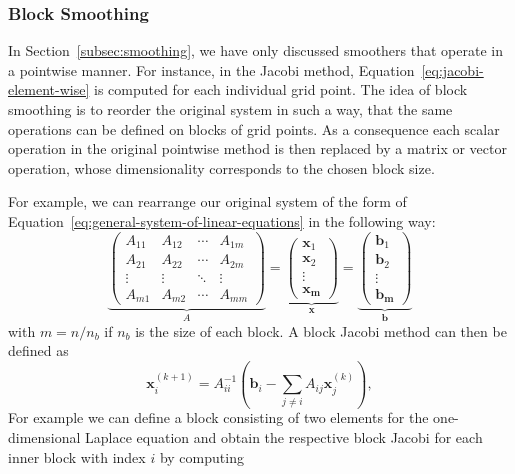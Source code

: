 \subsubsection{Block Smoothing}
\label{subsec:block-smoothing}
In Section~\ref{subsec:smoothing}, we have only discussed smoothers that operate in a pointwise manner.
For instance, in the Jacobi method, Equation~\eqref{eq:jacobi-element-wise} is computed for each individual grid point.
The idea of block smoothing is to reorder the original system in such a way, that the same operations can be defined on blocks of grid points.
As a consequence each scalar operation in the original pointwise method is then replaced by a matrix or vector operation, whose dimensionality corresponds to the chosen block size.

For example, we can rearrange our original system of the form of Equation~\eqref{eq:general-system-of-linear-equations} in the following way:
\begin{equation}
\underbrace{
\begin{pmatrix}A_{11}&A_{12}&\cdots &A_{1m}\\A_{21}&A_{22}&\cdots &A_{2m}\\\vdots &\vdots &\ddots &\vdots \\A_{m1}&A_{m2}&\cdots &A_{mm}\end{pmatrix}}_{A}
 = 
\underbrace{
\begin{pmatrix}
\bm{x}_1 \\ \bm{x}_2 \\ \vdots \\ \bm{x_m} 
\end{pmatrix}}_{\bm{x}} =
\underbrace{
\begin{pmatrix}
	\bm{b}_1 \\ \bm{b}_2 \\ \vdots \\ \bm{b_m} 
\end{pmatrix}}_{\bm{b}}
\end{equation}
with $m = n / n_b$ if $n_b$ is the size of each block.
A block Jacobi method can then be defined as
\begin{equation}
	\bm{x}_{i}^{(k+1)}=A_{ii}^{-1}\left(\bm{b}_{i}-\sum _{j\neq i}A_{ij}\bm{x}_{j}^{(k)}\right),
	\label{eq:jacobi-block-wise}
\end{equation}
For example we can define a block consisting of two elements for the one-dimensional Laplace equation and obtain the respective block Jacobi for each inner block with index $i$ by computing
